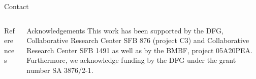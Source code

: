 \documentclass[t]{beamer}
\begin{document}
\begin{columns}[onlytextwidth]
\begin{column}{0.4\textwidth}
\begin{block}[equal height group=Z]{Contact}
\begin{center}
\begin{figure}[ht]
\begin{minipage}[ht]{0.24\linewidth}
            \end{minipage}
          \end{figure}
        \end{center}
      \end{block}
    \end{column}
    \end{columns}

  \vspace*{\fill}
  \begin{columns}[onlytextwidth]%
    \begin{column}{0.75\textwidth}%
      \begin{alertblock}[equal height group=bottom, fonttitle=\normalsize]{References}
        \begin{multicols}{3}
          \footnotesize%
          \printbibliography%
        \end{multicols}
      \end{alertblock}
    \end{column}
    \begin{column}{0.25\textwidth}%
      \begin{alertblock}[equal height group=bottom, fonttitle=\normalsize]{Acknowledgements}
          \footnotesize%
          This work has been supported by the DFG, Collaborative Research Center SFB 876 (project C3) and Collaborative Research Center SFB 1491 as well as by the BMBF, project 05A20PEA.\\
          Furthermore, we acknowledge funding by the DFG under the grant number SA 3876/2-1.
      \end{alertblock}
    \end{column}
  \end{columns}

\end{document}
